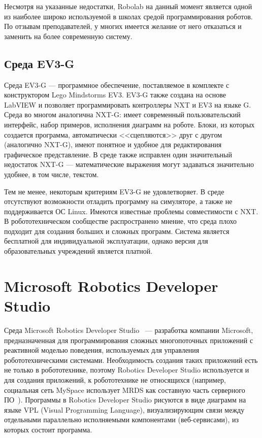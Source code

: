 \documentclass[a5paper]{article}
\begin{document}
Несмотря на указанные недостатки, Robolab на данный момент является одной из наиболее широко используемой в 
школах средой программирования роботов. По отзывам преподавателей, у многих имеется желание от него 
отказаться и заменить на более современную систему.

\subsection{Среда EV3-G}

Среда EV3-G --- программное обеспечение, поставляемое в комплекте с конструктором Lego Mindstorms EV3. 
EV3-G также создана на основе LabVIEW и позволяет программировать контроллеры NXT и EV3 на языке G. 
Среда во многом аналогична NXT-G: имеет современный пользовательский интерфейс, набор примеров, исполнения диаграмм 
на роботе. Блоки, из которых создается программа, автоматически <<сцепляются>> друг с другом (аналогично NXT-G), 
имеют понятное и удобное для редактирования графическое представление. В среде также исправлен один 
значительный недостаток NXT-G --- математические выражения могут задаваться значительно удобнее, в том числе, текстом. 

Тем не менее, некоторым критериям EV3-G не удовлетворяет. В среде отсутствуют возможности отладить программу 
на симуляторе, а также не поддерживается ОС Linux. Имеются известные проблемы совместимости с NXT. В 
робототехническом сообществе распространено мнение, что среда плохо подходит для создания больших и сложных 
программ. Система является бесплатной для индивидуальной эксплуатации, однако версия для образовательных 
учреждений является платной.

\section{Microsoft Robotics Developer Studio}

Среда Microsoft Robotics Developer Studio~\cite{jackson2007microsoft} --- разработка компании Microsoft, 
предназначенная для программирования сложных многопоточных приложений с реактивной моделью поведения, 
используемых для управления робототехническими системами. 
Необходимость создания таких приложений есть не только в робототехнике, поэтому Robotics Developer Studio используется 
и для создания приложений, к робототехнике не относящихся (например, социальная сеть MySpace использует MRDS 
как составную часть серверного ПО~\cite{scherotter2009ccr}). Программы в Robotics Developer Studio 
рисуются в виде диаграмм на языке VPL (Visual Programming Language), визуализирующим связи между 
отдельными параллельно исполняемыми компонентами (веб-сервисами), из которых состоит программа.
\end{document}
